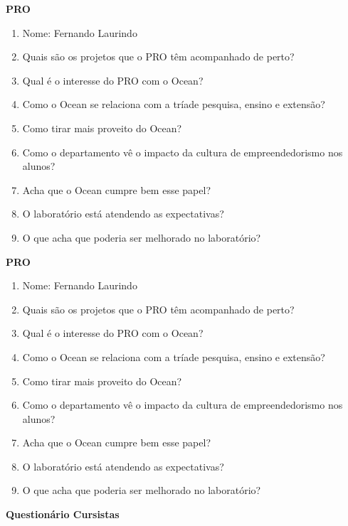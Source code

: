 \begin{anexosenv}
\clearpage

\textbf{PRO}

\begin{enumerate}
\item Nome: Fernando Laurindo
\item Quais são os projetos que o PRO têm acompanhado de perto?
\item Qual é o interesse do PRO com o Ocean?
\item Como o Ocean se relaciona com a tríade pesquisa, ensino e extensão?
\item Como tirar mais proveito do Ocean?
\item Como o departamento vê o impacto da cultura de empreendedorismo nos alunos?
\item Acha que o Ocean cumpre bem esse papel?
\item O laboratório está atendendo as expectativas?
\item O que acha que poderia ser melhorado no laboratório?
\end{enumerate}

\clearpage

\textbf{PRO}

\begin{enumerate}
\item Nome: Fernando Laurindo
\item Quais são os projetos que o PRO têm acompanhado de perto?
\item Qual é o interesse do PRO com o Ocean?
\item Como o Ocean se relaciona com a tríade pesquisa, ensino e extensão?
\item Como tirar mais proveito do Ocean?
\item Como o departamento vê o impacto da cultura de empreendedorismo nos alunos?
\item Acha que o Ocean cumpre bem esse papel?
\item O laboratório está atendendo as expectativas?
\item O que acha que poderia ser melhorado no laboratório?
\end{enumerate}

\clearpage

\textbf{Questionário Cursistas}


\end{anexosenv}
